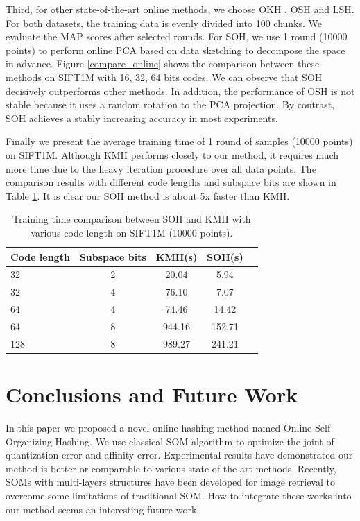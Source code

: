 \documentclass{article}
\begin{document}
Third, for other state-of-the-art online methods, we choose OKH \cite{huang2013online}, OSH \cite{leng2015online} and LSH. For both datasets, the training data is evenly divided into 100 chunks. We evaluate the MAP scores after selected rounds. For SOH, we use 1 round (10000 points) to perform online PCA based on data sketching to decompose the space in advance.
Figure \ref{compare_online} shows the comparison between these methods on SIFT1M with 16, 32, 64 bits codes. We can observe  that SOH decisively outperforms other methods. In addition, the performance of OSH is not stable because it uses  a random rotation to the PCA projection. By contrast, SOH achieves a stably increasing accuracy in most experiments.

Finally we present the average training time of 1 round of samples (10000 points) on SIFT1M.
Although KMH performs closely to our method, it requires much more time due to the heavy iteration procedure over all data points. The comparison results with different code lengths and subspace bits are shown in Table \ref{traintime-table}. It is clear our SOH method is about 5x faster than KMH.
\begin{table}[ht]
	\caption{Training time comparison between SOH and KMH with various code length on SIFT1M (10000 points).}
	\label{traintime-table}
	\begin{center}
		\begin{small}
			\begin{sc}
				\begin{tabular}{lcccr}
					\hline
					Code length & Subspace bits & KMH(s)& SOH(s) \\
					\hline
					32    & 2 & 20.04& 5.94\\
					32    & 4 & 76.10& 7.07\\
					64    & 4 & 74.46& 14.42\\
					64    & 8 & 944.16& 152.71\\
					128   & 8 & 989.27& 241.21\\
					\hline
				\end{tabular}
			\end{sc}
		\end{small}
	\end{center}
\end{table}
\section{Conclusions and Future Work}
In this paper we proposed a novel online hashing method named Online Self-Organizing Hashing. We use classical SOM algorithm to optimize the joint of quantization error and affinity error.  Experimental
results have demonstrated our method is better or comparable to various state-of-the-art methods.
Recently, SOMs with multi-layers structures \cite{rauber2002growing,chow2006content} have been developed for image retrieval to overcome
some limitations of traditional SOM. How to integrate these works into our method seems an interesting future work.
\end{document}
